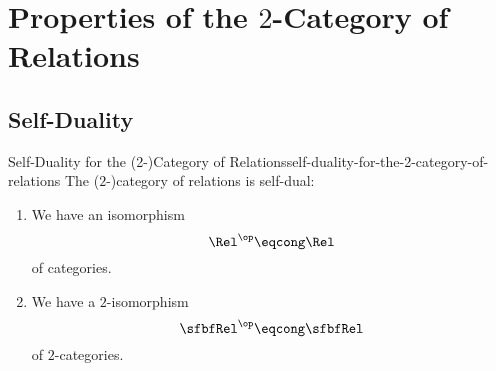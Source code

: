 \section{Properties of the $2$-Category of Relations}\label{section-properties-of-the-2-category-of-relations}
\subsection{Self-Duality}\label{subsection-self-duality-of-rel}
\begin{proposition}{Self-Duality for the (2-)Category of Relations}{self-duality-for-the-2-category-of-relations}%
    The ($2$-)category of relations is self-dual:
    \begin{enumerate}
        \item\label{self-duality-for-the-2-category-of-relations-1}We have an isomorphism
            \[
                \Rel^{\op}%
                \eqcong%
                \Rel%
            \]%
            of categories.
        \item\label{self-duality-for-the-2-category-of-relations-2}We have a $2$-isomorphism
            \[
                \sfbfRel^{\op}%
                \eqcong%
                \sfbfRel%
            \]%
            of $2$-categories.
    \end{enumerate}
\end{proposition}
